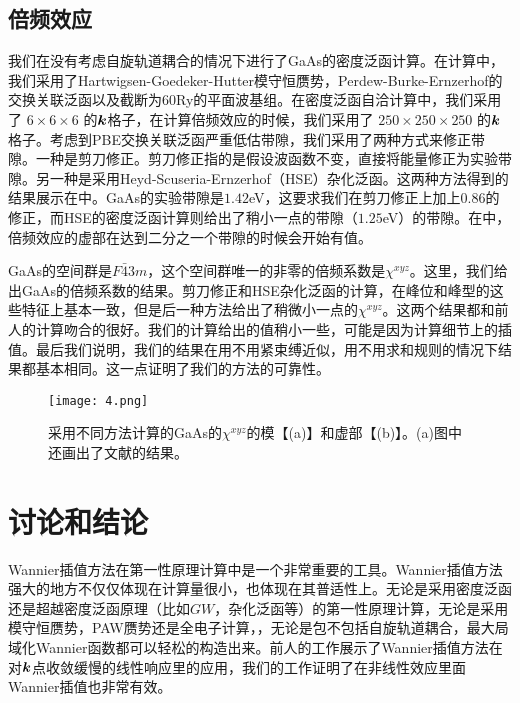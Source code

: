 \subsection{倍频效应}


我们在没有考虑自旋轨道耦合的情况下进行了GaAs的密度泛函计算。在计算中，我们采用了Hartwigsen-Goedeker-Hutter模守恒赝势\cite{hartwigsen_relativistic_1998}，Perdew-Burke-Ernzerhof的交换关联泛函\cite{perdew_generalized_1996}以及截断为60Ry的平面波基组。在密度泛函自洽计算中，我们采用了 $6\times6\times6$ 的$\boldsymbol{k}$格子，在计算倍频效应的时候，我们采用了 $250\times250\times250$ 的$\boldsymbol{k}$格子。考虑到PBE交换关联泛函严重低估带隙，我们采用了两种方式来修正带隙。一种是剪刀修正\cite{nastos_scissors_2005}。剪刀修正指的是假设波函数不变，直接将能量修正为实验带隙。另一种是采用Heyd-Scuseria-Ernzerhof（HSE）杂化泛函\cite{heyd_hybrid_2003}。这两种方法得到的结果展示在中。GaAs的实验带隙是$1.42$eV，这要求我们在剪刀修正上加上$0.86$的修正，而HSE的密度泛函计算则给出了稍小一点的带隙（$1.25$eV）的带隙。在中，倍频效应的虚部在达到二分之一个带隙的时候会开始有值。

GaAs的空间群是$F\bar{4}3m$，这个空间群唯一的非零的倍频系数是$\chi^{xyz}$。这里，我们给出GaAs的倍频系数的结果。剪刀修正和HSE杂化泛函的计算，在峰位和峰型的这些特征上基本一致，但是后一种方法给出了稍微小一点的$\chi^{xyz}$。这两个结果都和前人的计算吻合的很好\cite{rashkeev_efficient_1998,nastos_scissors_2005,hughes_calculation_1996}。我们的计算给出的值稍小一些，可能是因为计算细节上的插值。最后我们说明，我们的结果在用不用紧束缚近似，用不用求和规则的情况下结果都基本相同。这一点证明了我们的方法的可靠性。

\begin{figure}
	\begin{centering}
	\texttt{[image: 4.png]}
	\par\end{centering}
	\caption{\label{fig4} 采用不同方法计算的GaAs的$\chi^{xyz}$的模【(a)】和虚部【(b)】。(a)图中还画出了文献的结果。}
	\end{figure}
\section{讨论和结论\label{sec:discussions-and-conclusions}}


Wannier插值方法在第一性原理计算中是一个非常重要的工具。Wannier插值方法强大的地方不仅仅体现在计算量很小，也体现在其普适性上。无论是采用密度泛函还是超越密度泛函原理（比如$GW$，杂化泛函等）的第一性原理计算，无论是采用模守恒赝势，PAW赝势还是全电子计算，，无论是包不包括自旋轨道耦合，最大局域化Wannier函数都可以轻松的构造出来。前人的工作展示了Wannier插值方法在对$\boldsymbol{k}$点收敛缓慢的线性响应里的应用，我们的工作证明了在非线性效应里面Wannier插值也非常有效。



